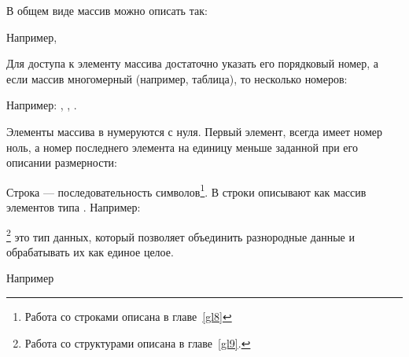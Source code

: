 В общем виде массив можно описать так:


Например,





Для доступа к элементу массива достаточно указать его порядковый номер, а если
массив многомерный (например, таблица), то несколько номеров:



Например: , , .

Элементы массива в  нумеруются с нуля. Первый элемент, всегда имеет 
номер ноль, а номер последнего элемента на
единицу меньше заданной при его описании размерности: 



Строка --- последовательность символов\footnote{Работа со строками описана в главе~\ref{gl8}}. В
 строки описывают как массив элементов типа . Например:


\footnote{Работа со структурами описана в главе~\ref{gl9}.} это тип данных,
который позволяет объединить разнородные данные и обрабатывать их как единое целое.

Например


\Sys{\{}




\Sys{\}}



